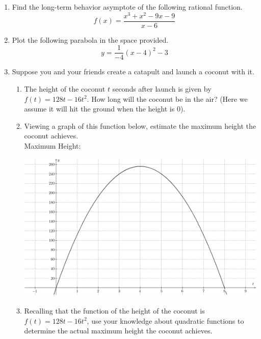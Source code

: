 \documentclass{article}
\begin{document}
\begin{enumerate}
\begin{center}
\CartesianPlane[axes=yes,h=10,w=10]
\end{center} \vspace{1cm}

\newpage

\item Find the long-term behavior asymptote of the following rational function. \[ f(x) = \frac{x^3 + x^2 - 9x - 9}{x - 6} \] \vspace{6cm}

\item Plot the following parabola in the space provided. \[ y = \frac{1}{-4} \left(x - 4\right)^2 -3 \]

\begin{center}
\CartesianPlane[axes=yes,h=10,w=10]
\end{center} \vspace{1cm}

\newpage

\item Suppose you and your friends create a catapult and launch a coconut with it.
\begin{enumerate}
\item The height of the coconut $t$ seconds after launch is given by $f(t)=128t-16t^2$. How long will the coconut be in the air? (Here we assume it will hit the ground when the height is $0$).
\vspace{1in}
\item Viewing a graph of this function below, estimate the maximum height the coconut achieves. \vspace{.25in}\\ 
Maximum Height: \\ \vspace{.25in}
\begin{center}
\includegraphics[scale=.5]{ca/tex/coconut.png}
\end{center}
\item Recalling that the function of the height of the coconut is $f(t)=128t-16t^2$, use your knowledge about quadratic functions to determine the actual maximum height the coconut achieves.
\end{enumerate}
\end{enumerate}
\end{document}
